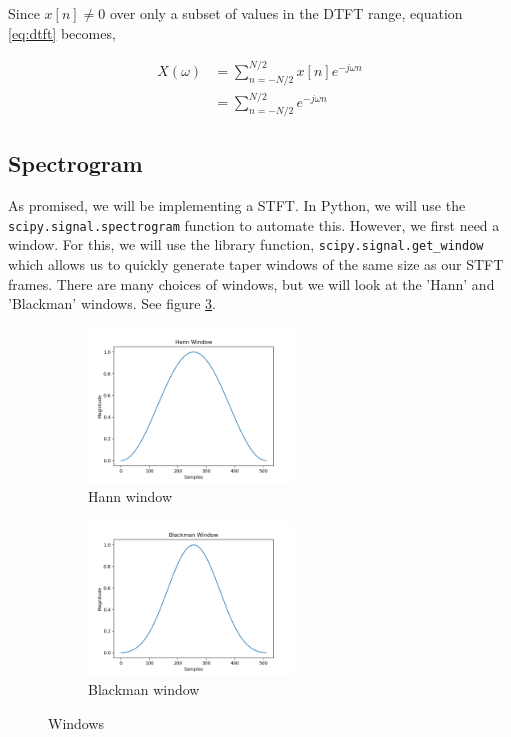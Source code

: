 \documentclass[11pt,a4paper]{article}
\begin{document}
Since $x[n]\neq 0$ over only a subset of values in the DTFT range, equation \eqref{eq:dtft} becomes,

\begin{align*}
X(\omega) &= \sum_{n=-N/2}^{N/2} x[n]e^{-j\omega n} \\
		  &= \sum_{n=-N/2}^{N/2} e^{-j\omega n} 
\end{align*}

\clearpage

\subsection{Spectrogram} As promised, we will be implementing a STFT. In Python, we will use the \verb|scipy.signal.spectrogram| function to automate this. However, we first need a window. For this, we will use the library function, \verb|scipy.signal.get_window| which allows us to quickly generate taper windows of the same size as our STFT frames. There are many choices of windows, but we will look at the 'Hann' and 'Blackman' windows. See figure \ref{fig:windows}.

\begin{figure}[ht]
	\centering
	\begin{subfigure}[t]{\hsize}
	\centering
		\includegraphics[width=0.6\textwidth]{hann}
		\caption{Hann window}
		\label{fig:hann}
	\end{subfigure}
	\begin{subfigure}[t]{\hsize}
		\centering
		\includegraphics[width=0.6\textwidth]{blackman}
		\caption{Blackman window}
		\label{fig:blackman}
	\end{subfigure}
	\caption{Windows}
	\label{fig:windows}
\end{figure}
\end{document}
